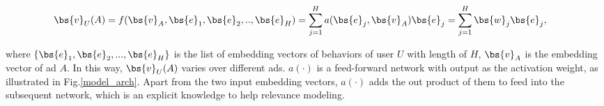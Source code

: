 
{
\begin{small}
\begin{eqnarray}
\begin{split}
\label{eq:attention}
\bs{v}_U(A) = f(\bs{v}_A,\bs{e}_1,\bs{e}_2,..,\bs{e}_H) & = \sum_{j=1}^H a(\bs{e}_j,\bs{v}_A) \bs{e}_j = \sum_{j=1}^H \bs{w}_j \bs{e}_j,
\end{split}
\end{eqnarray}
\end{small}
}
where $\{\bs{e}_1, \bs{e}_2, ..., \bs{e}_H\}$ is the list of embedding vectors of behaviors of user $U$ with length of $H$, $\bs{v}_A$ is the embedding vector of ad $A$. In this way, $\bs{v}_U(A)$ varies over different ads. $a(\cdot)$ is a feed-forward network with output as the activation weight, as illustrated in Fig.\ref{model_arch}. Apart from the two input embedding vectors, $a(\cdot)$ adds the out product of them to feed into the subsequent network, which is an explicit knowledge to help relevance   modeling.   

